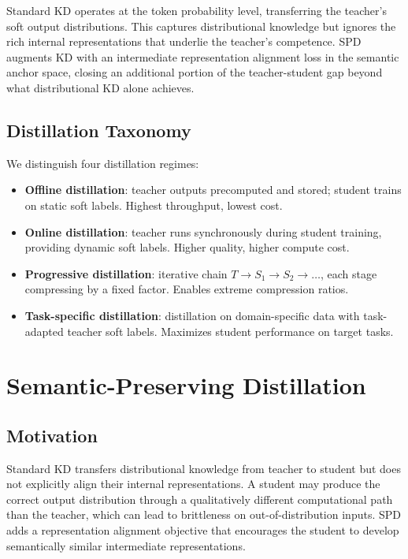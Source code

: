 \documentclass[11pt,a4paper]{article}
\begin{document}
Standard KD operates at the token probability level, transferring the teacher's
soft output distributions. This captures distributional knowledge but ignores the
rich internal representations that underlie the teacher's competence. SPD augments
KD with an intermediate representation alignment loss in the semantic anchor space,
closing an additional portion of the teacher-student gap beyond what distributional
KD alone achieves.

\subsection{Distillation Taxonomy}

We distinguish four distillation regimes:

\begin{itemize}
    \item \textbf{Offline distillation}: teacher outputs precomputed and stored; student
          trains on static soft labels. Highest throughput, lowest cost.
    \item \textbf{Online distillation}: teacher runs synchronously during student
          training, providing dynamic soft labels. Higher quality, higher compute cost.
    \item \textbf{Progressive distillation}: iterative chain $T \to S_1 \to S_2 \to \ldots$,
          each stage compressing by a fixed factor. Enables extreme compression ratios.
    \item \textbf{Task-specific distillation}: distillation on domain-specific data with
          task-adapted teacher soft labels. Maximizes student performance on target tasks.
\end{itemize}

\section{Semantic-Preserving Distillation}
\label{sec:spd}

\subsection{Motivation}

Standard KD transfers distributional knowledge from teacher to student but does not
explicitly align their internal representations. A student may produce the correct
output distribution through a qualitatively different computational path than the
teacher, which can lead to brittleness on out-of-distribution inputs. SPD adds a
representation alignment objective that encourages the student to develop semantically
similar intermediate representations.
\end{document}
